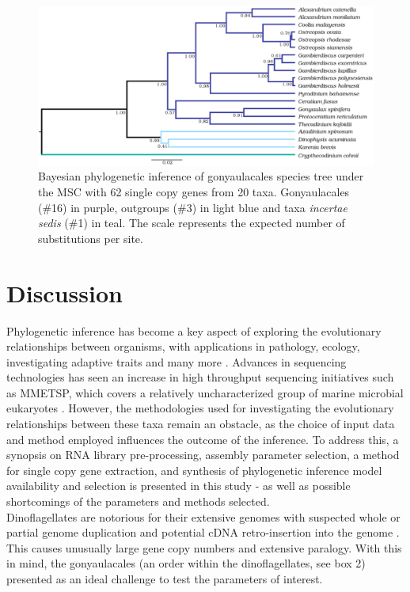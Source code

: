 \documentclass[fleqn,10pt,lineno]{wlpeerj} %
\begin{document}
\begin{figure}[ht]
\centering
\includegraphics[width=\linewidth]{gonya-figs/Aug2-20-taxa-combined-fig-MCC-trees.png} 
\caption{Bayesian phylogenetic inference of gonyaulacales species tree under the MSC with 62 single copy genes from 20 taxa. Gonyaulacales (\#16) in purple, outgroups (\#3) in light blue and taxa \textit{incertae sedis} (\#1) in teal. The scale represents the expected number of substitutions per site.} 
\label{fig:SCmscBI}
\end{figure} 


\section*{Discussion}
Phylogenetic inference has become a key aspect of exploring the evolutionary relationships between organisms, with applications in pathology, ecology, investigating adaptive traits and many more \cite{heath2008taxon}.
Advances in sequencing technologies has seen an increase in high throughput sequencing initiatives such as MMETSP, which covers a relatively uncharacterized group of marine microbial eukaryotes \cite{keeling2014marine}. 
However, the methodologies used for investigating the evolutionary relationships between these taxa remain an obstacle, as the choice of input data and method employed influences the outcome of the inference. 
To address this, a synopsis on RNA library pre-processing, assembly parameter selection, a method for single copy gene extraction, and synthesis of phylogenetic inference model availability and selection is presented in this study - as well as possible shortcomings of the parameters and methods selected. \\
Dinoflagellates are notorious for their extensive genomes with suspected whole or partial genome duplication and potential cDNA retro-insertion into the genome \cite{van2009florida,beauchemin2012dinoflagellate,slamovits2008widespread,hou2009distinct,lin2011genomic}. 
This causes unusually large gene copy numbers and extensive paralogy. 
With this in mind, the gonyaulacales (an order within the dinoflagellates, see box 2) presented as an ideal challenge to test the parameters of interest.
\end{document}
